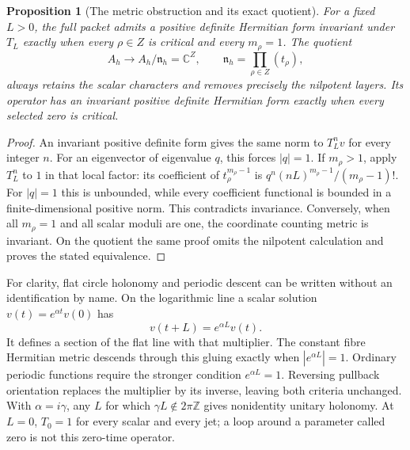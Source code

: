\documentclass[11pt,a4paper]{article}
\newtheorem{proposition}[theorem]{Proposition}
\theoremstyle{definition}\newtheorem{definition}[theorem]{Definition}
\newcommand{\Z}{\mathbb Z}\newcommand{\Q}{\mathbb Q}
\newcommand{\C}{\mathbb C}\newcommand{\R}{\mathbb R}
\begin{document}
\begin{proposition}[The metric obstruction and its exact quotient]
\label{hw:metricprop}
For a fixed \(L>0\), the full packet admits a positive definite
Hermitian form invariant under \(T_L\) exactly when every
\(\rho\in Z\) is critical and every \(m_\rho=1\).
The quotient
\[
 A_h\longrightarrow A_h/\mathfrak n_h=\C^Z,\qquad
 \mathfrak n_h=\prod_{\rho\in Z}(t_\rho),
 \tag{HW16}\label{hw:nilquotient}
\]
always retains the scalar characters and removes precisely the
nilpotent layers. Its operator has an invariant positive definite
Hermitian form exactly when every selected zero is critical.
\end{proposition}
\begin{proof}
An invariant positive definite form gives the same norm to
\(T_L^nv\) for every integer \(n\). For an eigenvector of
eigenvalue \(q\), this forces \(|q|=1\).
If \(m_\rho>1\), apply \(T_L^n\) to \(1\) in that local
factor: its coefficient of \(t_\rho^{m_\rho-1}\) is
\(q^n(nL)^{m_\rho-1}/(m_\rho-1)!\).
For \(|q|=1\) this is unbounded, while every coefficient
functional is bounded in a finite-dimensional positive norm.
This contradicts invariance. Conversely, when all \(m_\rho=1\)
and all scalar moduli are one, the coordinate counting metric
is invariant. On the quotient the same proof omits the nilpotent
calculation and proves the stated equivalence.
\end{proof}

For clarity, flat circle holonomy and periodic descent can be
written without an identification by name. On the logarithmic
line a scalar solution \(v(t)=e^{\alpha t}v(0)\) has
\[
 v(t+L)=e^{\alpha L}v(t).
 \tag{HW17}
\]
It defines a section of the flat line with that multiplier.
The constant fibre Hermitian metric descends through this
gluing exactly when \(|e^{\alpha L}|=1\).
Ordinary periodic functions require the stronger condition
\(e^{\alpha L}=1\). Reversing pullback orientation replaces
the multiplier by its inverse, leaving both criteria unchanged.
With \(\alpha=i\gamma\), any \(L\) for which
\(\gamma L\notin2\pi\Z\) gives nonidentity unitary holonomy.
At \(L=0\), \(T_0=1\) for every scalar and every jet; a loop
around a parameter called zero is not this zero-time operator.
\end{document}
